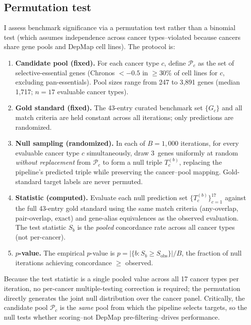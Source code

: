 \documentclass[times, twoside, watermark]{zHenriquesLab-StyleBioRxiv}
\begin{document}
\subsection*{Permutation test}
I assess benchmark significance via a permutation test rather than a binomial test (which assumes independence across cancer types--violated because cancers share gene pools and DepMap cell lines). The protocol is:
\begin{enumerate}
\item \textbf{Candidate pool (fixed).} For each cancer type $c$, define $\mathcal{P}_c$ as the set of selective-essential genes (Chronos $< -0.5$ in $\geq$30\% of cell lines for $c$, excluding pan-essentials). Pool sizes range from 247 to 3{,}891 genes (median 1{,}717; $n = 17$ evaluable cancer types).
\item \textbf{Gold standard (fixed).} The 43-entry curated benchmark set $\{G_c\}$ and all match criteria are held constant across all iterations; only predictions are randomized.
\item \textbf{Null sampling (randomized).} In each of $B = 1{,}000$ iterations, for every evaluable cancer type $c$ simultaneously, draw 3~genes uniformly at random \emph{without replacement} from $\mathcal{P}_c$ to form a null triple $T_c^{(b)}$, replacing the pipeline's predicted triple while preserving the cancer--pool mapping. Gold-standard target labels are never permuted.
\item \textbf{Statistic (computed).} Evaluate each null prediction set $\{T_c^{(b)}\}_{c=1}^{17}$ against the full 43-entry gold standard using the same match criteria (any-overlap, pair-overlap, exact) and gene-alias equivalences as the observed evaluation. The test statistic $S_b$ is the \emph{pooled} concordance rate across all cancer types (not per-cancer).
\item \textbf{$p$-value.} The empirical $p$-value is $p = |\{b : S_b \geq S_{\text{obs}}\}| / B$, the fraction of null iterations achieving concordance $\geq$ observed.
\end{enumerate}
Because the test statistic is a single pooled value across all 17 cancer types per iteration, no per-cancer multiple-testing correction is required; the permutation directly generates the joint null distribution over the cancer panel. Critically, the candidate pool $\mathcal{P}_c$ is the \emph{same} pool from which the pipeline selects targets, so the null tests whether scoring--not DepMap pre-filtering--drives performance.
\end{document}
